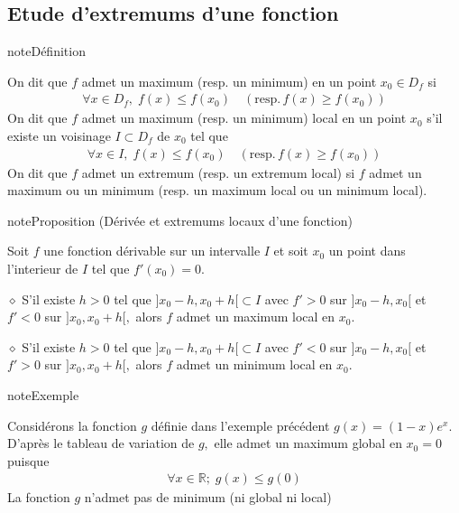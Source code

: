 \documentclass[letterpaper,10pt,french]{jupyterBook}
\begin{document}
\subsection{Etude d’extremums d’une fonction}
\label{\detokenize{dirivfs:etude-d-extremums-d-une-fonction}}
\begin{sphinxadmonition}{note}{Définition}

\sphinxAtStartPar
On dit que \(f\) admet un maximum (resp. un minimum) en un point \(x_0\in D_f\) si
\begin{equation*}
\begin{split}
\forall x\in D_f,\; f(x)\leq f(x_0)\quad (\mbox{resp.}\, f(x)\geq f(x_0))
\end{split}
\end{equation*}
\sphinxAtStartPar
On dit que \(f\) admet un maximum (resp. un minimum) local en un point \(x_0\) s’il existe un voisinage \(I\subset D_f\) de \(x_0\) tel que
\begin{equation*}
\begin{split}
\forall x\in I,\;f(x)\leq f(x_0)\quad (\mbox{resp.}\, f(x)\geq f(x_0))
\end{split}
\end{equation*}
\sphinxAtStartPar
On dit que \(f\) admet un extremum (resp. un extremum local) si \(f\) admet un maximum ou un minimum (resp. un maximum local ou un minimum local).
\end{sphinxadmonition}

\begin{sphinxadmonition}{note}{Proposition (Dérivée et extremums locaux d’une fonction)}

\sphinxAtStartPar
Soit \(f\) une fonction dérivable sur un intervalle \(I\) et soit \(x_0\) un point dans l’interieur de \(I\) tel que \(f'(x_0)=0.\)

\sphinxAtStartPar
\(\diamond\) S’il existe \(h>0\) tel que \(]x_0 -h,x_0 +h[\subset I\) avec \(f'>0\) sur \(]x_0-h,x_0[\) et \(f'<0\) sur \(]x_0,x_0+h[,\) alors \(f\) admet un maximum local en \(x_0.\)

\sphinxAtStartPar
\(\diamond\) S’il existe \(h>0\) tel que \(]x_0 -h,x_0 +h[\subset I\) avec \(f'<0\) sur \(]x_0-h,x_0[\) et \(f'>0\) sur \(]x_0,x_0+h[,\) alors \(f\) admet un minimum local en \(x_0.\)
\end{sphinxadmonition}

\begin{sphinxadmonition}{note}{Exemple}

\sphinxAtStartPar
Considérons la fonction \(g\) définie dans l’exemple précédent \(g(x)=(1-x)e^x.\) D’après le tableau de variation de \(g,\) elle admet un maximum global en \(x_0=0\) puisque
\begin{equation*}
\begin{split}
\forall x\in \mathbb{R};\; g(x)\leq g(0)
\end{split}
\end{equation*}
\sphinxAtStartPar
La fonction \(g\) n’admet pas de minimum (ni global ni local)
\end{sphinxadmonition}
\end{document}
